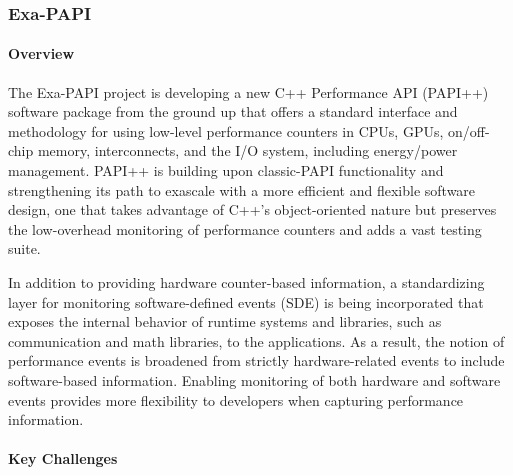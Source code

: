 \subsubsection{ Exa-PAPI}\label{subsubsect:exapapi}

\paragraph{Overview} 


The Exa-PAPI 
project is developing a new C++ Performance API (PAPI++) software package 
from the ground up that offers a standard interface and methodology for using
low-level performance counters in CPUs, GPUs, on/off-chip memory, interconnects, 
and the I/O system, including energy/power management. 
PAPI++ is building upon classic-PAPI functionality and strengthening its path to
exascale with a more efficient and flexible software design, one that takes 
advantage of C++'s object-oriented nature but preserves the low-overhead 
monitoring of performance counters and adds a vast testing suite.

In addition to providing hardware counter-based information, a standardizing layer 
for monitoring software-defined events (SDE) is being incorporated that exposes 
the internal behavior of runtime systems and libraries, such as communication and 
math libraries, to the applications. As a result, the notion of performance events is 
broadened from strictly hardware-related events to include software-based 
information. Enabling monitoring of both hardware and software events provides 
more flexibility to developers when capturing performance information.


\paragraph{Key Challenges}

